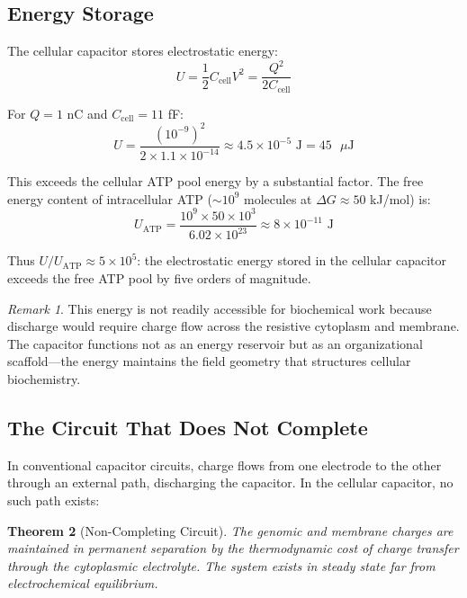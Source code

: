 \documentclass[twocolumn,10pt,aps,prd,superscriptaddress,floatfix,nofootinbib]{revtex4-2}
\newtheorem{theorem}{Theorem}[section]
\theoremstyle{remark}
\newtheorem{remark}[theorem]{Remark}
\begin{document}
\subsection{Energy Storage}

The cellular capacitor stores electrostatic energy:
\begin{equation}
U = \frac{1}{2}C_{\mathrm{cell}}V^2 = \frac{Q^2}{2C_{\mathrm{cell}}}
\label{eq:energy_storage}
\end{equation}

For $Q = 1$ nC and $C_{\mathrm{cell}} = 11$ fF:
\begin{equation}
U = \frac{(10^{-9})^2}{2 \times 1.1 \times 10^{-14}} \approx 4.5 \times 10^{-5} \text{ J} = 45 \text{ $\mu$J}
\end{equation}

This exceeds the cellular ATP pool energy by a substantial factor. The free energy content of intracellular ATP ($\sim 10^{9}$ molecules at $\Delta G \approx 50$ kJ/mol) is:
\begin{equation}
U_{\mathrm{ATP}} = \frac{10^{9} \times 50 \times 10^{3}}{6.02 \times 10^{23}} \approx 8 \times 10^{-11} \text{ J}
\end{equation}

Thus $U/U_{\mathrm{ATP}} \approx 5 \times 10^{5}$: the electrostatic energy stored in the cellular capacitor exceeds the free ATP pool by five orders of magnitude.

\begin{remark}
This energy is not readily accessible for biochemical work because discharge would require charge flow across the resistive cytoplasm and membrane. The capacitor functions not as an energy reservoir but as an organizational scaffold---the energy maintains the field geometry that structures cellular biochemistry.
\end{remark}

\subsection{The Circuit That Does Not Complete}

In conventional capacitor circuits, charge flows from one electrode to the other through an external path, discharging the capacitor. In the cellular capacitor, no such path exists:

\begin{theorem}[Non-Completing Circuit]
\label{thm:non_completing}
The genomic and membrane charges are maintained in permanent separation by the thermodynamic cost of charge transfer through the cytoplasmic electrolyte. The system exists in steady state far from electrochemical equilibrium.
\end{theorem}
\end{document}
